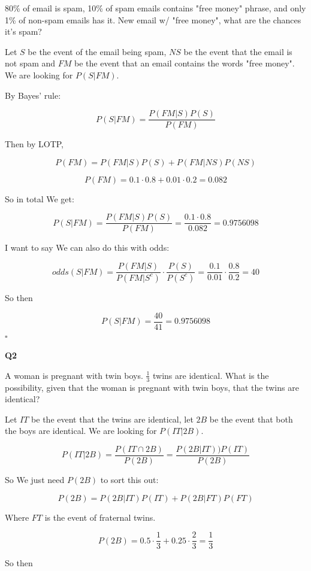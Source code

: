 \documentclass{article}
\newcommand{\qed}{\hfill$\square$}
\begin{document}
			80\% of email is spam, 10\% of spam emails contains "free money" phrase, and only 1\% of non-spam emails has it. New email w/ "free money", what are the chances it's spam?
			
			Let $S$ be the event of the email being spam, $NS$ be the event that the email is not spam and $FM$ be the event that an email contains the words "free money". We are looking for $P(S\vert FM)$.
			
			By Bayes' rule:
			
			$$P(S\vert FM) = \frac{P(FM\vert S)P(S)}{P(FM)}$$
			
			Then by LOTP, 
			
			$$P(FM) = P(FM\vert S)P(S) + P(FM\vert NS)P(NS)$$
			
			$$P(FM) = 0.1\cdot 0.8 + 0.01\cdot 0.2 = 0.082$$
			
			So in total We get:
			
			$$P(S\vert FM) = \frac{P(FM\vert S)P(S)}{P(FM)} = \frac{0.1\cdot 0.8}{0.082} = 0.9756098$$
			
			I want to say We can also do this with odds:
			
			$$odds(S\vert FM) = \frac{P(FM\vert S)}{P(FM\vert S^c)}\cdot \frac{P(S)}{P(S^c)} = \frac{0.1}{0.01}\cdot\frac{0.8}{0.2} = 40$$
			
			So then 
			
			$$P(S\vert FM) = \frac{40}{41} = 0.9756098$$\qed
			
		\hfill 
			
		\textbf{Q2}
		
			A woman is pregnant with twin boys. $\frac{1}{3}$ twins are identical. What is the possibility, given that the woman is pregnant with twin boys, that the twins are identical?
			
			Let $IT$ be the event that the twins are identical, let $2B$ be the event that both the boys are identical. We are looking for $P(IT\vert 2B)$.
			
			$$P(IT\vert 2B) = \frac{P(IT \cap 2B)}{P(2B)} = \frac{P(2B\vert IT))P(IT)}{P(2B)}$$
			
			So We just need $P(2B)$ to sort this out:
			
			$$P(2B) = P(2B\vert IT)P(IT) + P(2B\vert FT)P(FT)$$
			
			Where $FT$ is the event of fraternal twins.
			
			$$P(2B) = 0.5\cdot\frac{1}{3} + 0.25\cdot\frac{2}{3} = \frac{1}{3}$$
			
			So then
			
\end{document}
